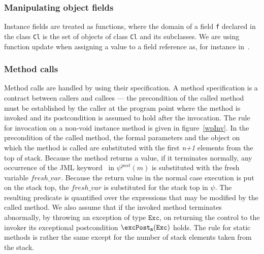 \subsubsection{Manipulating object fields}
Instance fields are treated as functions, where the domain of a field \texttt{f} 
declared in the class \texttt{Cl} is the set of objects of class \texttt{Cl} and its subclasses.
We are using function update when assigning a value to a field reference as, for instance in~\cite{B00ppp}. 





\subsubsection{Method calls}
Method calls are handled by using their specification. A method specification is a contract between callers and callees --- the precondition of the called method
must be established by the caller at the program point where the method is invoked and its postcondition is assumed to hold after the invocation. The rule for
invocation on a non-void instance method is given in figure~\ref{wpInv}. In the precondition of the called method, the formal parameters and the object on which the method is called are substituted with the first \textit{n+1} elements from the top of stack. 
Because the method returns a value, if it terminates normally, any occurrence of the JML keyword \result \ in $\psi^{post}(m)$ is substituted with the fresh variable $fresh\_var$.  
Because the return value in the normal case execution is put on the stack top, the $fresh\_var$ is substituted for the stack top in $\psi$. The resulting predicate is quantified over the expressions that may be modified by the called method. We also assume that if the invoked method terminates abnormally, by throwing an exception of type $\texttt{Exc}$, on returning the control to the invoker its exceptional postcondition $\excPost_{\tt{m} }( \tt{Exc} )$ holds. 
The rule for static methods is rather the same except for the number of stack elements taken from the stack.  

